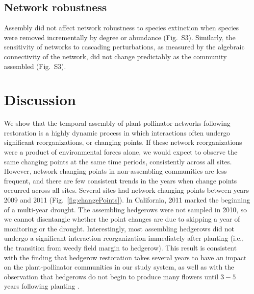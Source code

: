 \documentclass[12pt]{article}
\begin{document}
\subsection*{Network robustness}
Assembly did not affect network robustness to species extinction when
species were removed incrementally by degree or abundance
(Fig.~S3). Similarly, the sensitivity of networks to cascading
perturbations, as measured by the algebraic connectivity of the
network, did not change predictably as the community assembled
(Fig.~S3).

\section*{Discussion}
\label{sec:discussion}

We show that the temporal assembly of plant-pollinator networks
following restoration is a highly dynamic process in which
interactions often undergo significant reorganizations, or changing
points. If these network reorganizations were a product of
environmental forces alone, we would expect to observe the same
changing points at the same time periods, consistently across all
sites. However, network changing points in non-assembling communities
are less frequent, and there are few consistent trends in the years
when change points occurred across all sites. Several sites had
network changing points between years 2009 and 2011
(Fig.~\ref{fig:changePoints}). In California, 2011 marked the
beginning of a multi-year drought. The assembling hedgerows were not
sampled in 2010, so we cannot disentangle whether the point changes
are due to skipping a year of monitoring or the
drought. Interestingly, most assembling hedgerows did not undergo a
significant interaction reorganization immediately after planting
(i.e., the transition from weedy field margin to hedgerow). This
result is consistent with the finding that hedgerow restoration takes
several years to have an impact on the plant-pollinator communities in
our study system, as well as with the observation that hedgerows do
not begin to produce many flowers until $3-5$ years following planting
\citep{kremen-2015-602}.
\end{document}
